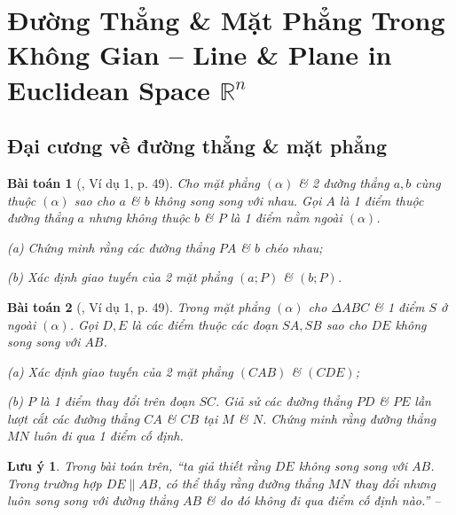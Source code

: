 \documentclass{article}
\numberwithin{equation}{section}
\newtheorem{baitoan}{Bài toán}[section]
\newtheorem{luuy}{Lưu ý}[section]
\begin{document}

\section{Đường Thẳng \& Mặt Phẳng Trong Không Gian -- Line \& Plane in Euclidean Space $\mathbb{R}^n$}

\subsection{Đại cương về đường thẳng \& mặt phẳng}

\begin{baitoan}[\cite{TL_chuyen_Toan_Hinh_Hoc_11}, Ví dụ 1, p. 49]
	Cho mặt phẳng $(\alpha)$ \& 2 đường thẳng $a,b$ cùng thuộc $(\alpha)$ sao cho $a$ \& $b$ không song song với nhau. Gọi $A$ là 1 điểm thuộc đường thẳng $a$ nhưng không thuộc $b$ \& $P$ là 1 điểm nằm ngoài $(\alpha)$.
	\begin{enumerate*}
		\item[(a)] Chứng minh rằng các đường thẳng $PA$ \& $b$ chéo nhau;
		\item[(b)] Xác định giao tuyến của 2 mặt phẳng $(a;P)$ \& $(b;P)$.
	\end{enumerate*}
\end{baitoan}

\begin{baitoan}[\cite{TL_chuyen_Toan_Hinh_Hoc_11}, Ví dụ 1, p. 49]
	Trong mặt phẳng $(\alpha)$ cho $\Delta ABC$ \& 1 điểm $S$ ở ngoài $(\alpha)$. Gọi $D,E$ là các điểm thuộc các đoạn $SA,SB$ sao cho $DE$ không song song với $AB$.
	\begin{enumerate*}
		\item[(a)] Xác định giao tuyến của 2 mặt phẳng $(CAB)$ \& $(CDE)$;
		\item[(b)] $P$ là 1 điểm thay đổi trên đoạn $SC$. Giả sử các đường thẳng $PD$ \& $PE$ lần lượt cắt các đường thẳng $CA$ \& $CB$ tại $M$ \& $N$. Chứng minh rằng đường thẳng $MN$ luôn đi qua 1 điểm cố định.
	\end{enumerate*}
\end{baitoan}

\begin{luuy}
	Trong bài toán trên, ``ta giả thiết rằng $DE$ không song song với $AB$. Trong trường hợp $DE\parallel AB$, có thể thấy rằng đường thẳng $MN$ thay đổi nhưng luôn song song với đường thẳng $AB$ \& do đó không đi qua điểm cố định nào.'' -- \cite[p. 51]{TL_chuyen_Toan_Hinh_Hoc_11}
\end{luuy}
\end{document}
